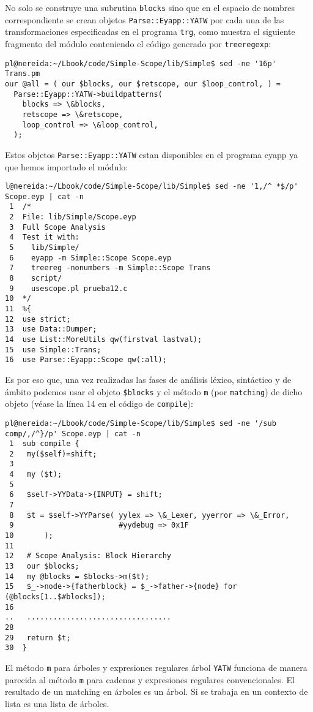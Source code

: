 No solo se construye una subrutina \verb|blocks| sino que en el espacio de nombres
correspondiente se crean objetos  \verb|Parse::Eyapp::YATW| por cada una de las
transformaciones especificadas en el programa \verb|trg|, como muestra el siguiente
fragmento del módulo conteniendo el código generado por \verb|treeregexp|:
\begin{verbatim}
pl@nereida:~/Lbook/code/Simple-Scope/lib/Simple$ sed -ne '16p' Trans.pm
our @all = ( our $blocks, our $retscope, our $loop_control, ) = 
  Parse::Eyapp::YATW->buildpatterns(
    blocks => \&blocks, 
    retscope => \&retscope, 
    loop_control => \&loop_control, 
  );
\end{verbatim}

Estos objetos \verb|Parse::Eyapp::YATW| estan disponibles 
en el programa eyapp ya que hemos importado el módulo: 
\begin{verbatim}
l@nereida:~/Lbook/code/Simple-Scope/lib/Simple$ sed -ne '1,/^ *$/p' Scope.eyp | cat -n
 1  /*
 2  File: lib/Simple/Scope.eyp
 3  Full Scope Analysis
 4  Test it with:
 5    lib/Simple/
 6    eyapp -m Simple::Scope Scope.eyp
 7    treereg -nonumbers -m Simple::Scope Trans
 8    script/
 9    usescope.pl prueba12.c
10  */
11  %{
12  use strict;
13  use Data::Dumper;
14  use List::MoreUtils qw(firstval lastval);
15  use Simple::Trans;
16  use Parse::Eyapp::Scope qw(:all);
\end{verbatim}

Es por eso que, una vez realizadas las fases de análisis léxico, 
sintáctico y de ámbito podemos usar el objeto  \verb|$blocks| 
y el método \verb|m| (por \verb|matching|) de dicho objeto
(véase la línea 14 en el código de \verb|compile|):

\begin{verbatim}
pl@nereida:~/Lbook/code/Simple-Scope/lib/Simple$ sed -ne '/sub comp/,/^}/p' Scope.eyp | cat -n
 1  sub compile {
 2   my($self)=shift;
 3
 4   my ($t);
 5
 6   $self->YYData->{INPUT} = shift;
 7
 8   $t = $self->YYParse( yylex => \&_Lexer, yyerror => \&_Error,
 9                        #yydebug => 0x1F
10       );
11
12   # Scope Analysis: Block Hierarchy
13   our $blocks;
14   my @blocks = $blocks->m($t);
15   $_->node->{fatherblock} = $_->father->{node} for (@blocks[1..$#blocks]);
16
..   .................................
28
29   return $t;
30  }
\end{verbatim}

El método \verb|m| para árboles y expresiones regulares árbol
\verb|YATW| funciona de manera parecida 
al método \verb|m| para cadenas y expresiones regulares convencionales.
El resultado de un matching en árboles es un árbol. Si se trabaja en un contexto
de lista es una lista de árboles.

